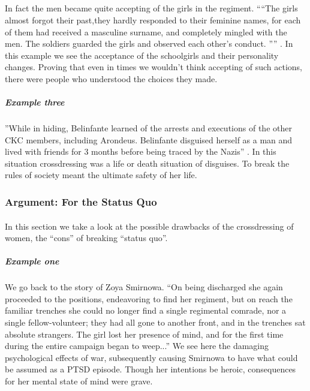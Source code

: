 \subparagraph{}
In fact the men became quite accepting of the girls in the regiment.
````The girls almost forgot their past,they hardly responded to their feminine
names, for each of them had received a masculine surname, and completely mingled
with the men. The soldiers guarded the girls and observed each other's conduct.
'''' \cite[p.~366]{YGFRF}. In this example we see the acceptance of the
schoolgirls and their personality changes. Proving that even in times we
wouldn't think accepting of such actions, there were people who understood the
choices they made.
\par

\subparagraph{Example three}
''While in hiding, Belinfante learned of the arrests and executions of the other
CKC members, including Arondeus. Belinfante disguised herself as a man and lived
with friends for 3 months  before being traced by the Nazis''
\cite[t.~00:28:40-00:39:00]{BIWG}. In this situation crossdressing was a life or
death situation of disguises. To break the rules of society meant the ultimate
safety of her life.
\par

\subsubsection{Argument: For the Status Quo}

\paragraph{}
In this section we take a look at the possible drawbacks of the crossdressing of
women, the ``cons'' of breaking ``status quo''.
\par

\subparagraph{Example one} We go back to the story of Zoya Smirnowa. ``On being
discharged she again proceeded to the positions, endeavoring to find her
regiment, but on reach the familiar trenches she could no longer find a single
regimental comrade, nor a single fellow-volunteer; they had all gone to another
front, and in the trenches sat absolute strangers. The girl lost her presence of
mind, and for the first time during the entire campaign began to weep...''
\cite[p.~367]{YGFRF} We see here the damaging psychological effects of war,
subsequently causing Smirnowa to have what could be assumed as a PTSD episode.
Though her intentions be heroic, consequences for her mental state of mind were
grave.
\par

